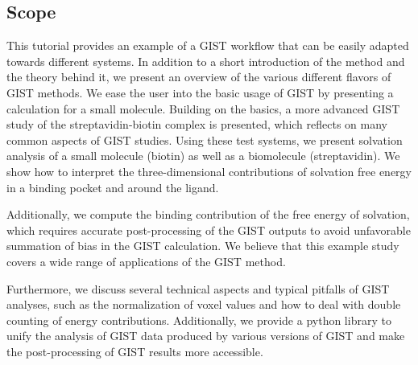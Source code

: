 \documentclass[9pt,tutorial]{livecoms}
\begin{document}
%
%
%

\subsection{Scope}

This tutorial provides an example of a GIST workflow that can be easily adapted towards different systems. 
In addition to a short introduction of the method and the theory behind it, we present an overview of the various different flavors of GIST methods.
We ease the user into the basic usage of GIST by presenting a calculation for a small molecule.
Building on the basics, a more advanced GIST study of the streptavidin-biotin complex is presented, which reflects on many common aspects of GIST studies.
Using these test systems, we present solvation analysis of a small molecule (biotin) as well as a biomolecule (streptavidin).
We show how to interpret the three-dimensional contributions of solvation free energy in a binding pocket and around the ligand.

Additionally, we compute the binding contribution of the free energy of solvation, which requires accurate post-processing of the GIST outputs to avoid unfavorable summation of bias in the GIST calculation.
We believe that this example study covers a wide range of applications of the GIST method.

Furthermore, we discuss several technical aspects  and typical pitfalls of GIST analyses, such as the normalization of voxel values and how to deal with double counting of energy contributions. 
Additionally, we provide a python library to unify the analysis of GIST data produced by various versions of GIST and make the post-processing of GIST results more accessible.
\end{document}
